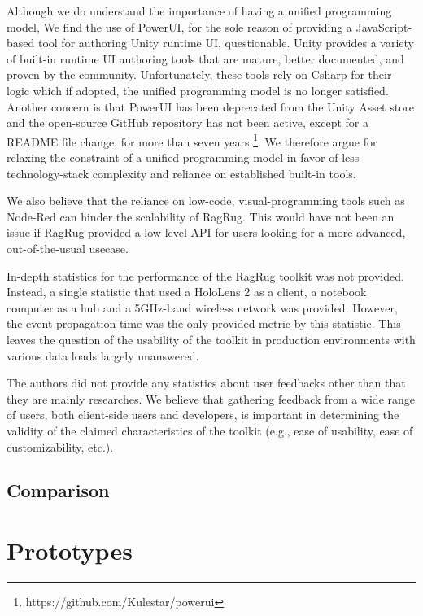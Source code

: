 \documentclass{vgtc}                          %
\begin{document}
\noindent Although we do understand the importance of having a unified programming model, We find the use of
PowerUI, for the sole reason of providing a JavaScript-based tool for authoring Unity runtime UI,
questionable. Unity provides a variety of built-in runtime UI authoring tools that are mature,
better documented, and proven by the community. Unfortunately, these tools rely on Csharp for their logic
which if adopted, the unified programming model is no longer satisfied. Another concern is that PowerUI has
been deprecated from the Unity Asset store and the open-source GitHub repository has not been active, except
for a README file change, for more than seven years \footnote{https://github.com/Kulestar/powerui}. We
therefore argue for relaxing the constraint of a unified programming model in favor of less technology-stack
complexity and reliance on established built-in tools.

\smallskip

\noindent We also believe that the reliance on low-code, visual-programming tools such as Node-Red can hinder
the scalability of RagRug. This would have not been an issue if RagRug provided a low-level API for users
looking for a more advanced, out-of-the-usual usecase.

\medskip

\noindent In-depth statistics for the performance of the RagRug toolkit was not provided. Instead, a single
statistic that used a HoloLens 2 as a client, a notebook computer as a hub and a 5GHz-band wireless network
was provided. However, the event propagation time was the only provided metric by this statistic.
This leaves the question of the usability of the toolkit in production environments with various data loads
largely unanswered.

\medskip

\noindent The authors did not provide any statistics about user feedbacks other than that they are mainly
researches. We believe that gathering feedback from a wide range of users, both client-side users and
developers, is important in determining the validity of the claimed characteristics of the toolkit (e.g.,
ease of usability, ease of customizability, etc.).

\subsection{Comparison}

\section{Prototypes}
\end{document}
